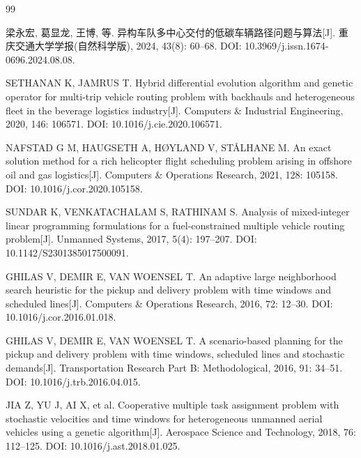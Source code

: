 
\renewcommand{\refname}{参考文献}
\begin{thebibliography}{99}
\setlength{\itemsep}{0.35em}
\setlength{\parsep}{0pt}

梁永宏, 葛显龙, 王博, 等. 异构车队多中心交付的低碳车辆路径问题与算法[J]. 重庆交通大学学报(自然科学版), 2024, 43(8): 60--68. DOI: 10.3969/j.issn.1674-0696.2024.08.08.

SETHANAN K, JAMRUS T. Hybrid differential evolution algorithm and genetic operator for multi-trip vehicle routing problem with backhauls and heterogeneous fleet in the beverage logistics industry[J]. Computers \& Industrial Engineering, 2020, 146: 106571. DOI: 10.1016/j.cie.2020.106571.

NAFSTAD G M, HAUGSETH A, HØYLAND V, STÅLHANE M. An exact solution method for a rich helicopter flight scheduling problem arising in offshore oil and gas logistics[J]. Computers \& Operations Research, 2021, 128: 105158. DOI: 10.1016/j.cor.2020.105158.

SUNDAR K, VENKATACHALAM S, RATHINAM S. Analysis of mixed-integer linear programming formulations for a fuel-constrained multiple vehicle routing problem[J]. Unmanned Systems, 2017, 5(4): 197--207. DOI: 10.1142/S2301385017500091.

GHILAS V, DEMIR E, VAN WOENSEL T. An adaptive large neighborhood search heuristic for the pickup and delivery problem with time windows and scheduled lines[J]. Computers \& Operations Research, 2016, 72: 12--30. DOI: 10.1016/j.cor.2016.01.018.

GHILAS V, DEMIR E, VAN WOENSEL T. A scenario-based planning for the pickup and delivery problem with time windows, scheduled lines and stochastic demands[J]. Transportation Research Part B: Methodological, 2016, 91: 34--51. DOI: 10.1016/j.trb.2016.04.015.

JIA Z, YU J, AI X, et al. Cooperative multiple task assignment problem with stochastic velocities and time windows for heterogeneous unmanned aerial vehicles using a genetic algorithm[J]. Aerospace Science and Technology, 2018, 76: 112--125. DOI: 10.1016/j.ast.2018.01.025.

\end{thebibliography}
